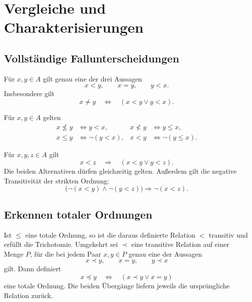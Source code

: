 \chapter{Vergleiche und Charakterisierungen}
\label{b15guide:ch:comparison}

\section{Vollständige Fallunterscheidungen}

\begin{theorem}[Trichotomie]
\label{b15guide:thm:trichotomy}
Für $x,y\in A$ gilt genau eine der drei Aussagen
\[
 x<y,\qquad x=y,\qquad y<x.
\]
Insbesondere gilt
\[
 x\ne y\quad\Longleftrightarrow\quad(x<y\lor y<x).
\]
\end{theorem}

\begin{theorem}
\label{b15guide:thm:negation}
Für $x,y\in A$ gelten
\[
\begin{aligned}
 x\not\leq y&\Longleftrightarrow y<x,&
 x\not<y&\Longleftrightarrow y\leq x,\\
 x\leq y&\Longleftrightarrow\neg(y<x),&
 x<y&\Longleftrightarrow\neg(y\leq x).
\end{aligned}
\]
\end{theorem}

\begin{theorem}
\label{b15guide:thm:split}
Für $x,y,z\in A$ gilt
\[
 x<z\quad\Longrightarrow\quad (x<y\lor y<z).
\]
Die beiden Alternativen dürfen gleichzeitig gelten. Außerdem gilt
die negative Transitivität der strikten Ordnung:
\[
 \bigl(\neg(x<y)\land\neg(y<z)\bigr)\Rightarrow\neg(x<z).
\]
\end{theorem}

\section{Erkennen totaler Ordnungen}

\begin{theorem}
\label{b15guide:thm:strict-characterization}
Ist $\leq$ eine totale Ordnung, so ist die daraus definierte
Relation $<$ transitiv und erfüllt die Trichotomie.
Umgekehrt sei $\prec$ eine transitive Relation auf einer Menge
$P$, für die bei jedem Paar $x,y\in P$ genau eine der Aussagen
\[
 x\prec y,\qquad x=y,\qquad y\prec x
\]
gilt. Dann definiert
\[
 x\preceq y\quad\Longleftrightarrow\quad(x\prec y\lor x=y)
\]
eine totale Ordnung. Die beiden Übergänge liefern jeweils
die ursprüngliche Relation zurück.
\end{theorem}

